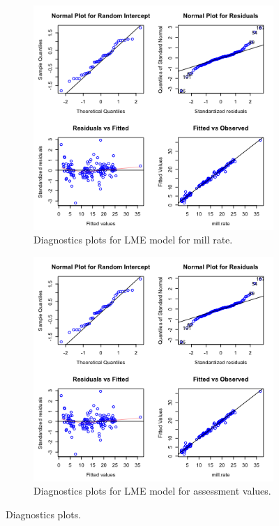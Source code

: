 \documentclass{article}
\begin{document}
\begin{figure}[ht]
\centering
\begin{subfigure}{.5\textwidth}
  \centering
  \includegraphics[width=.9\textwidth]{figures/diagmill.png}
  \caption{Diagnostics plots for LME model for mill rate.}
  \label{fig:7a}
\end{subfigure}%
\begin{subfigure}{.5\textwidth}
  \centering
  \includegraphics[width=.9\textwidth]{figures/diagas.png}
  \caption{Diagnostics plots for LME model for assessment values.}
  \label{fig:7b}
\end{subfigure}
\caption{Diagnostics plots.}
\label{fig:7}
\end{figure}
\end{document}
